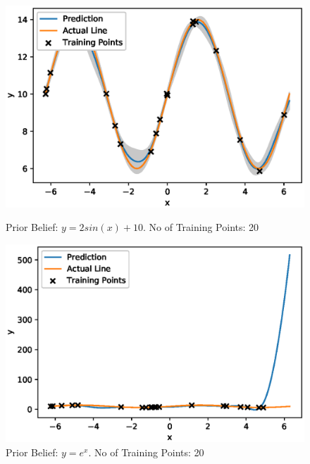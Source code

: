 \begin{figure}[H]
\centering
\begin{minipage}{.5\textwidth}
  \centering
        \includegraphics[width=\textwidth]{images/GP_Explanation/sin_mean_20_training.eps}
        
        \caption{Prior Belief: $y=2sin(x)+10$. No of Training Points: 20}
        \label{fig:gp_plot_y0_20}
\end{minipage}%
\begin{minipage}{.5\textwidth}
  \centering
        \includegraphics[width=\textwidth]{images/GP_Explanation/bad_mean_20_training.eps}
        \caption{Prior Belief: $y=e^x$. No of Training Points: 20}
        \label{fig:gp_plot_y10_20}
\end{minipage}
\end{figure}




